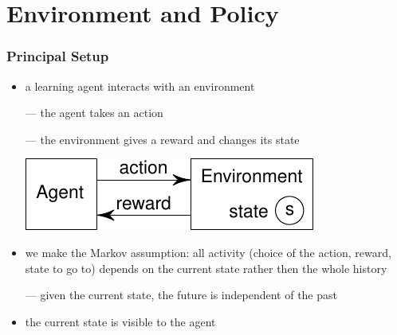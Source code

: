 \section[Preliminaries]{Environment and Policy}

\begin{frame}\frametitle{Principal Setup}

\begin{itemize}

\item a learning agent interacts with an environment

--- the agent takes an action

--- the environment gives a reward and changes its state

\bigskip

\includegraphics[scale=1]{agent_environment}

\item we make the Markov assumption: all activity (choice of the
action, reward, state to go to) depends on the
current state rather then the whole history

--- given the current state, the future is independent of the past

\item the current state is visible to the agent

\end{itemize}
\end{frame}


